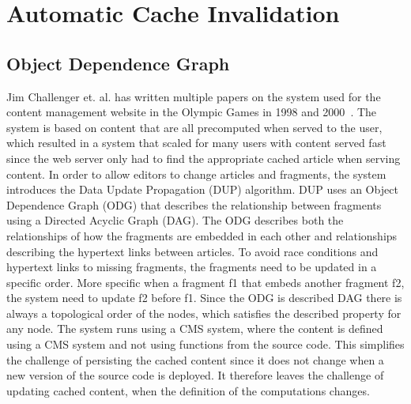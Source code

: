 \chapter{Automatic Cache Invalidation}
\label{chapter:invalidation}



\section{Object Dependence Graph}
\label{sec:object-dependence-graph}



Jim Challenger et. al. has written multiple papers on the system used for the content management website in the Olympic Games in 1998 and 2000~\cite{paper:ibm, paper:ibm-extended}. The system is based on content that are all precomputed when served to the user, which resulted in a system that scaled for many users with content served fast since the web server only had to find the appropriate cached article when serving content. In order to allow editors to change articles and fragments, the system introduces the Data Update Propagation (DUP) algorithm. DUP uses an Object Dependence Graph (ODG) that describes the relationship between fragments using a Directed Acyclic Graph (DAG). The ODG describes both the relationships of how the fragments are embedded in each other and relationships describing the hypertext links between articles. To avoid race conditions and hypertext links to missing fragments, the fragments need to be updated in a specific order. More specific when a fragment f1 that embeds another fragment f2, the system need to update f2 before f1. Since the ODG is described DAG there is always a topological order of the nodes, which satisfies the described property for any node. The system runs using a CMS system, where the content is defined using a CMS system and not using functions from the source code. This simplifies the challenge of persisting the cached content since it does not change when a new version of the source code is deployed. It therefore leaves the challenge of updating cached content, when the definition of the computations changes.

